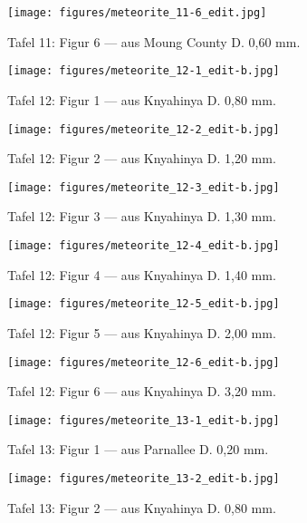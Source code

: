 \documentclass[a4paper, 11pt, oneside]{article}
\begin{document}
\clearpage
\begin{figure}[t]
\texttt{[image: figures/meteorite\_11-6\_edit.jpg]}
\caption{Tafel 11: Figur 6 --- aus Moung County D. 0,60 mm.}
\centering
\end{figure}
\clearpage
{}
\begin{figure}[t]
\texttt{[image: figures/meteorite\_12-1\_edit-b.jpg]}
\caption{Tafel 12: Figur 1 --- aus Knyahinya D. 0,80 mm.}
\centering
\end{figure}
\clearpage
\begin{figure}[t]
\texttt{[image: figures/meteorite\_12-2\_edit-b.jpg]}
\caption{Tafel 12: Figur 2 --- aus Knyahinya D. 1,20 mm.}
\centering
\end{figure}
\clearpage
\begin{figure}[t]
\texttt{[image: figures/meteorite\_12-3\_edit-b.jpg]}
\caption{Tafel 12: Figur 3 --- aus Knyahinya D. 1,30 mm.}
\centering
\end{figure}
\clearpage
\begin{figure}[t]
\texttt{[image: figures/meteorite\_12-4\_edit-b.jpg]}
\caption{Tafel 12: Figur 4 --- aus Knyahinya D. 1,40 mm.}
\centering
\end{figure}
\clearpage
\begin{figure}[t]
\texttt{[image: figures/meteorite\_12-5\_edit-b.jpg]}
\caption{Tafel 12: Figur 5 --- aus Knyahinya D. 2,00 mm.}
\centering
\end{figure}
\clearpage
\begin{figure}[t]
\texttt{[image: figures/meteorite\_12-6\_edit-b.jpg]}
\caption{Tafel 12: Figur 6 --- aus Knyahinya D. 3,20 mm.}
\centering
\end{figure}
\clearpage
{}
\begin{figure}[t]
\texttt{[image: figures/meteorite\_13-1\_edit-b.jpg]}
\caption{Tafel 13: Figur 1 --- aus Parnallee D. 0,20 mm.}
\centering
\end{figure}
\clearpage
\begin{figure}[t]
\texttt{[image: figures/meteorite\_13-2\_edit-b.jpg]}
\caption{Tafel 13: Figur 2 --- aus Knyahinya D. 0,80 mm.}
\centering
\end{figure}
\end{document}
